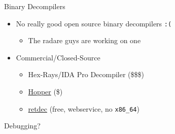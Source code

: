 \begin{frame}[fragile]
  {Binary Decompilers}

  \begin{itemize}
    \item No really good open source binary decompilers \verb+:(+
      \begin{itemize}
        \item The radare guys are working on one
      \end{itemize}
    \item Commercial/Closed-Source
      \begin{itemize}
        \item Hex-Rays/IDA Pro Decompiler (\$\$\$)
        \item \href{http://hopperapp.com/}{Hopper} (\$)
        \item \href{https://retdec.com/}{retdec} (free, webservice, no \verb+x86_64+)
      \end{itemize}
  \end{itemize}
\end{frame}

\begin{frame}[plain]
	\begin{center}
    \huge Debugging?
	\end{center}
\end{frame}



